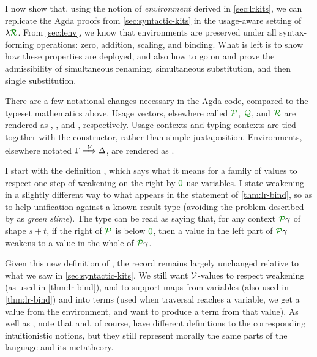 \def\LRKits{../agda/processed-latex/LRKits.tex}

I now show that, using the notion of \emph{environment} derived in
\cref{sec:lrkits}, we can replicate the Agda proofs from
\cref{sec:syntactic-kits} in the usage-aware setting of $\name$.
From \cref{sec:lenv}, we know that environments are preserved under all
syntax-forming operations: zero, addition, scaling, and binding.
What is left is to show how these properties are deployed, and also how to
go on and prove the admissibility of simultaneous renaming, simultaneous
substitution, and then single substitution.

There are a few notational changes necessary in the Agda code, compared to the
typeset mathematics above.
Usage vectors, elsewhere called $\grP$, $\grQ$, and $\grR$ are rendered as
, , and , respectively.
Usage contexts and typing contexts are tied together with the
 constructor, rather than simple juxtaposition.
Environments, elsewhere notated $\Gamma \stackrel{\mathcal V}\Longrightarrow \Delta$, are rendered as
\AgdaRecord{[}\AgdaSpace{}\AgdaBound{$\V$}\AgdaSpace{}\AgdaRecord{]}%
\AgdaSpace{}\AgdaBound{$\Gamma$}\AgdaSpace{}%
\AgdaSpace{}\AgdaBound{$\Delta$}.

I start with the definition , which says what it means
for a family of values \AgdaBound{$\V$} to respect one step of weakening on the
right by $\gr0$-use variables.
I state weakening in a slightly different way to what appears in the statement
of \cref{thm:lr-bind}, so as to help
unification against a known result type (avoiding the problem described by
\citet{McBride12} as \emph{green slime}).
The type \AgdaSpace{}\AgdaBound{$\V$} can be read as
saying that, for any context $\grP\gamma$ of shape $s + t$, if the right of
$\grP$ is below $\gr0$, then a value in the left part of $\grP\gamma$ weakens
to a value in the whole of $\grP\gamma$.

\ExecuteMetaData[\LRKits]{Weakening}

Given this new definition of , the record
 remains largely unchanged relative to what we saw in
\cref{sec:syntactic-kits}.
We still want $\V$-values to respect weakening (as used in \cref{thm:lr-bind}),
and to support maps  from variables (also used in
\cref{thm:lr-bind}) and  into terms (used when traversal reaches a
variable, we get a value from the environment, and want to produce a term from
that value).
As well as , note that \AgdaRecord{\_$\sqni$\_} and, of
course, \AgdaDatatype{\_$\vdash$\_} have different definitions to the
corresponding intuitionistic notions, but they still represent morally the same
parts of the language and its metatheory.

